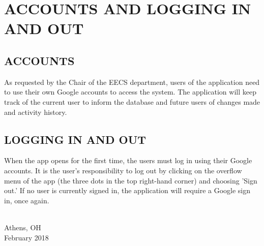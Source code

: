 \chapter{ACCOUNTS AND LOGGING IN AND OUT}

\section{ACCOUNTS}
As requested by the Chair of the EECS department, users of the application need to use their own Google accounts to access the system. The application will keep track of the current user to inform the database and future users of changes made and activity history.

\section{LOGGING IN AND OUT}
When the app opens for the first time, the users must log in using their Google accounts. It is the user's responsibility to log out by clicking on the overflow menu of the app (the three dots in the top right-hand corner) and choosing 'Sign out.'
If no user is currently signed in, the application will require a Google sign in, once again.

\vspace*{\fill}
{ \\ Athens, OH \\ February 2018\par}
